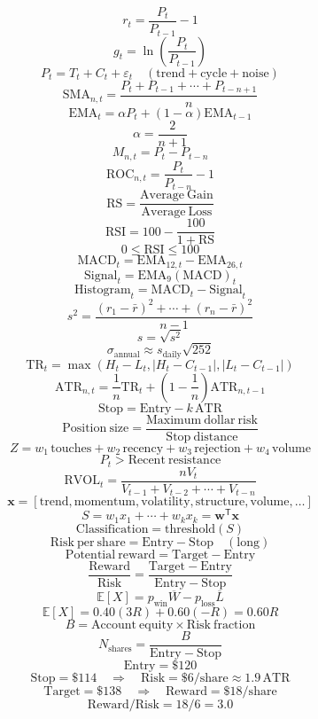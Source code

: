 \documentclass{article}
\begin{document}
\[
r_t=\frac{P_t}{P_{t-1}}-1
\]
\[
g_t=\ln\!\left(\frac{P_t}{P_{t-1}}\right)
\]
\[
P_t=T_t+C_t+\varepsilon_t\quad\mathrm{(trend+cycle+noise)}
\]
\[
\mathrm{SMA}_{n,t}=\frac{P_t+P_{t-1}+\cdots+P_{t-n+1}}{n}
\]
\[
\mathrm{EMA}_t=\alpha P_t+(1-\alpha)\mathrm{EMA}_{t-1}
\]
\[
\alpha=\frac{2}{n+1}
\]
\[
M_{n,t}=P_t-P_{t-n}
\]
\[
\mathrm{ROC}_{n,t}=\frac{P_t}{P_{t-n}}-1
\]
\[
\mathrm{RS}=\frac{\mathrm{Average\ Gain}}{\mathrm{Average\ Loss}}
\]
\[
\mathrm{RSI}=100-\frac{100}{1+\mathrm{RS}}
\]
\[
0\leq\mathrm{RSI}\leq100
\]
\[
\mathrm{MACD}_t=\mathrm{EMA}_{12,t}-\mathrm{EMA}_{26,t}
\]
\[
\mathrm{Signal}_t=\mathrm{EMA}_{9}(\mathrm{MACD})_t
\]
\[
\mathrm{Histogram}_t=\mathrm{MACD}_t-\mathrm{Signal}_t
\]
\[
s^2=\frac{(r_1-\bar r)^2+\cdots+(r_n-\bar r)^2}{n-1}
\]
\[
s=\sqrt{s^2}
\]
\[
\sigma_{\mathrm{annual}}\approx s_{\mathrm{daily}}\sqrt{252}
\]
\[
\mathrm{TR}_t=\max\!\left(H_t-L_t,\left|H_t-C_{t-1}\right|,\left|L_t-C_{t-1}\right|\right)
\]
\[
\mathrm{ATR}_{n,t}=\frac{1}{n}\mathrm{TR}_t+\left(1-\frac{1}{n}\right)\mathrm{ATR}_{n,t-1}
\]
\[
\mathrm{Stop}=\mathrm{Entry}-k\,\mathrm{ATR}
\]
\[
\mathrm{Position\ size}=\frac{\mathrm{Maximum\ dollar\ risk}}{\mathrm{Stop\ distance}}
\]
\[
Z=w_1\,\mathrm{touches}+w_2\,\mathrm{recency}+w_3\,\mathrm{rejection}+w_4\,\mathrm{volume}
\]
\[
P_t>\mathrm{Recent\ resistance}
\]
\[
\mathrm{RVOL}_t=\frac{nV_t}{V_{t-1}+V_{t-2}+\cdots+V_{t-n}}
\]
\[
\mathbf{x}=[\mathrm{trend},\mathrm{momentum},\mathrm{volatility},\mathrm{structure},\mathrm{volume},\ldots]
\]
\[
S=w_1x_1+\cdots+w_kx_k=\mathbf{w}^{\mathsf{T}}\mathbf{x}
\]
\[
\mathrm{Classification}=\mathrm{threshold}(S)
\]
\[
\mathrm{Risk\ per\ share}=\mathrm{Entry}-\mathrm{Stop}\quad\mathrm{(long)}
\]
\[
\mathrm{Potential\ reward}=\mathrm{Target}-\mathrm{Entry}
\]
\[
\frac{\mathrm{Reward}}{\mathrm{Risk}}=\frac{\mathrm{Target}-\mathrm{Entry}}{\mathrm{Entry}-\mathrm{Stop}}
\]
\[
\mathbb{E}[X]=p_{\mathrm{win}}\overline{W}-p_{\mathrm{loss}}\overline{L}
\]
\[
\mathbb{E}[X]=0.40(3R)+0.60(-R)=0.60R
\]
\[
B=\mathrm{Account\ equity}\times\mathrm{Risk\ fraction}
\]
\[
N_{\mathrm{shares}}=\frac{B}{\mathrm{Entry}-\mathrm{Stop}}
\]
\[
\mathrm{Entry}=\$120
\]
\[
\mathrm{Stop}=\$114\quad\Rightarrow\quad\mathrm{Risk}=\$6/\mathrm{share}\approx1.9\,\mathrm{ATR}
\]
\[
\mathrm{Target}=\$138\quad\Rightarrow\quad\mathrm{Reward}=\$18/\mathrm{share}
\]
\[
\mathrm{Reward}/\mathrm{Risk}=18/6=3.0
\]
\end{document}
